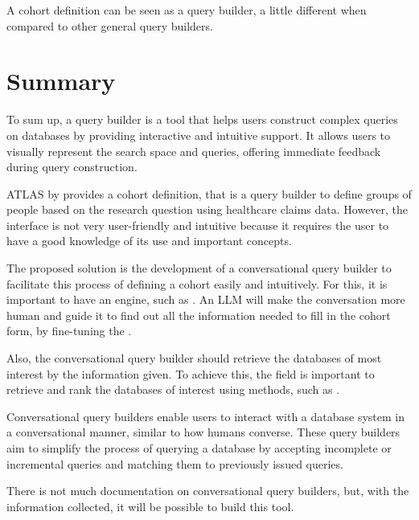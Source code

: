 A cohort definition can be seen as a query builder, a little different when compared to other general query builders.



\section{Summary}

To sum up, a query builder is a tool that helps users construct complex queries on databases by providing interactive and intuitive support. It allows users to visually represent the search space and queries, offering immediate feedback during query construction. 

ATLAS by {\ohdsi} provides a cohort definition, that is a query builder to define groups of people based on the research question using healthcare claims data. However, the interface is not very user-friendly and intuitive because it requires the user to have a good knowledge of its use and important concepts. 

The proposed solution is the development of a conversational query builder to facilitate this process of defining a cohort easily and intuitively. For this, it is important to have an {\nlp} engine, such as {\llm}. An LLM will make the conversation more human and guide it to find out all the information needed to fill in the cohort form, by fine-tuning the {\llm}.

Also, the conversational query builder should retrieve the databases of most interest by the information given. To achieve this, the {\ir} field is important to retrieve and rank the databases of interest using methods, such as {\bm}.


Conversational query builders enable users to interact with a database system in a conversational manner, similar to how humans converse. These query builders aim to simplify the process of querying a database by accepting incomplete or incremental queries and matching them to previously issued queries. 

There is not much documentation on conversational query builders, but, with the information collected, it will be possible to build this tool.